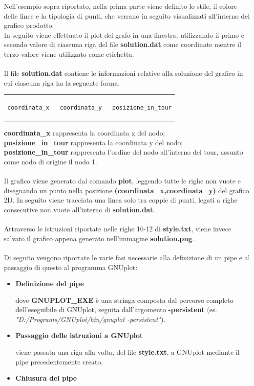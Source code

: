 Nell'esempio sopra riportato, nella prima parte viene definito lo stile, il colore delle linee e la tipologia di punti, che verrano in seguito visualizzati all'interno del grafico prodotto.\\In seguito viene effettuato il plot del grafo in una finestra, utilizzando il primo e secondo valore di ciascuna riga del file \textbf{solution.dat} come coordinate mentre il terzo valore viene utilizzato come etichetta.\\\\
Il file \textbf{solution.dat} contiene le informazioni relative alla soluzione del grafico in cui ciascuna riga ha la seguente forma:
\begin{center}
\begin{tabular}{c}
\begin{lstlisting}[linewidth=290pt,basicstyle=\footnotesize\sffamily,]     
coordinata_x   coordinata_y   posizione_in_tour
\end{lstlisting}
\end{tabular}
\end{center}
\textbf{coordinata\_x} rappresenta la coordinata x del nodo;\\
\textbf{posizione\_in\_tour} rappresenta la coordinata y del nodo;\\
\textbf{posizione\_in\_tour} rappresenta l'ordine del nodo all'interno del tour, assunto come nodo di origine il nodo 1.\\\\
Il grafico viene generato dal comando \textbf{plot}, leggendo tutte le righe non vuote e disegnando un punto nella posizione \textbf{(coordinata\_x,coordinata\_y)} del grafico 2D. In seguito viene tracciata una linea solo tra coppie di punti, legati a righe consecutive non vuote all'interno di \textbf{solution.dat}.\\\\
Attraverso le istruzioni riportate nelle righe 10-12 di \textbf{style.txt}, viene invece salvato il grafico appena generato nell'immagine \textbf{solution.png}.\\\\
Di seguito vengono riportate le varie fasi necessarie alla definizione di un pipe e al passaggio di questo al programma GNUplot:
\begin{itemize}
\item{\textbf{Definizione del pipe}

dove \textbf{GNUPLOT\_EXE} è una stringa composta dal percorso completo dell'eseguibile di GNUplot, seguita dall'argomento \textbf{-persistent} (es. \textit{"D:/Programs/GNUplot/bin/gnuplot -persistent"}).
}
\item{\textbf{Passaggio delle istruzioni a GNUplot}

viene passata una riga alla volta, del file \textbf{style.txt}, a GNUplot mediante il pipe precedentemente creato.
}
\item{\textbf{Chiusura del pipe}

}
\end{itemize}

